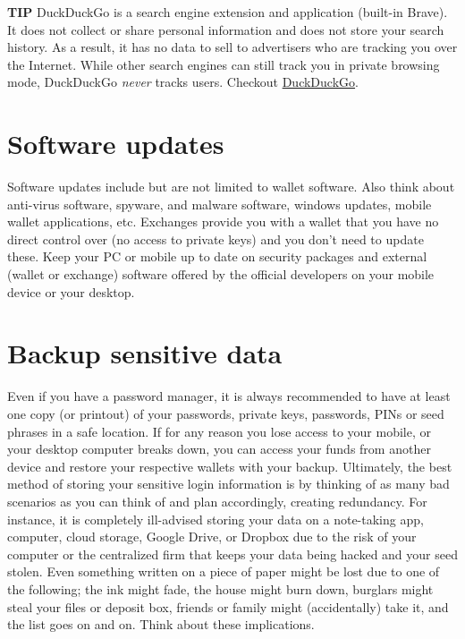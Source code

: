     \bigskip
    \begin{tipbox}{\textbf{TIP}}
        DuckDuckGo is a search engine extension and application (built-in Brave). It does not collect or share personal information and does not store your search history. As a result, it has no data to sell to advertisers who are tracking you over the Internet. While other search engines can still track you in private browsing mode, DuckDuckGo \emph{never} tracks users.
        \tcblower
        Checkout \href{https://duckduckgo.com/}{DuckDuckGo}.
    \end{tipbox}
    \bigskip

\section{Software updates}
Software updates include but are not limited to wallet software. Also think about anti-virus software, spyware, and malware software, windows updates, mobile wallet applications, etc. Exchanges provide you with a wallet that you have no direct control over (no access to private keys) and you don't need to update these. Keep your PC or mobile up to date on security packages and external (wallet or exchange) software offered by the official developers on your mobile device or your desktop.

\section{Backup sensitive data}
Even if you have a password manager, it is always recommended to have at least one copy (or printout) of your passwords, private keys, passwords, PINs or seed phrases in a safe location. If for any reason you lose access to your mobile, or your desktop computer breaks down, you can access your funds from another device and restore your respective wallets with your backup. Ultimately, the best method of storing your sensitive login information is by thinking of as many bad scenarios as you can think of and plan accordingly, creating redundancy. For instance, it is completely ill-advised storing your data on a note-taking app, computer, cloud storage, Google Drive, or Dropbox due to the risk of your computer or the centralized firm that keeps your data being hacked and your seed stolen. Even something written on a piece of paper might be lost due to one of the following; the ink might fade, the house might burn down, burglars might steal your files or deposit box, friends or family might (accidentally) take it, and the list goes on and on. Think about these implications.\medskip

